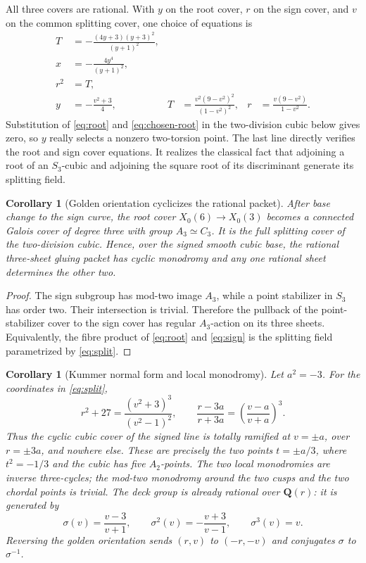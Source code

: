 \documentclass[11pt]{article}
\numberwithin{equation}{section}
\newtheorem{corollary}[theorem]{Corollary}
\theoremstyle{definition}
\theoremstyle{remark}
\newcommand{\Q}{\mathbf Q}
\begin{document}
All three covers are rational.  With \(y\) on the root cover, \(r\) on the
sign cover, and \(v\) on the common splitting cover, one choice of equations
is
\begin{align}
 T&=-\frac{(4y+3)(y+3)^2}{(y+1)^2},\label{eq:root}\\
 x&=-\frac{4y^4}{(y+1)^2},\label{eq:chosen-root}\\
 r^2&=T,\label{eq:sign}\\
 y&=-\frac{v^2+3}{4},&
 T&=\frac{v^2(9-v^2)^2}{(1-v^2)^2},&
 r&=\frac{v(9-v^2)}{1-v^2}.\label{eq:split}
\end{align}
Substitution of \eqref{eq:root} and \eqref{eq:chosen-root} in the
two-division cubic below gives zero, so \(y\) really selects a nonzero
two-torsion point.  The last line directly verifies the root and sign cover
equations.  It realizes the
classical fact that adjoining a root of an \(S_3\)-cubic and adjoining the
square root of its discriminant generate its splitting field.

\begin{corollary}[Golden orientation cyclicizes the rational packet]
After base change to the sign curve, the root cover \(X_0(6)\to X_0(3)\)
becomes a connected Galois cover of degree three with group \(A_3\simeq C_3\).
It is the full splitting cover of the two-division cubic.  Hence, over the
signed smooth cubic base, the rational three-sheet gluing packet has cyclic
monodromy and any one rational sheet determines the other two.
\end{corollary}

\begin{proof}
The sign subgroup has mod-two image \(A_3\), while a point stabilizer in
\(S_3\) has order two.  Their intersection is trivial.  Therefore the
pullback of the point-stabilizer cover to the sign cover has regular
\(A_3\)-action on its three sheets.  Equivalently, the fibre product of
\eqref{eq:root} and \eqref{eq:sign} is the splitting field parametrized by
\eqref{eq:split}.
\end{proof}

\begin{corollary}[Kummer normal form and local monodromy]
Let \(a^2=-3\).  For the coordinates in \eqref{eq:split},
\begin{equation}\label{eq:kummer-cubic}
 r^2+27=\frac{(v^2+3)^3}{(v^2-1)^2},
 \qquad
 \frac{r-3a}{r+3a}=\left(\frac{v-a}{v+a}\right)^3.
\end{equation}
Thus the cyclic cubic cover of the signed line is totally ramified at
\(v=\pm a\), over \(r=\pm3a\), and nowhere else.  These are precisely the
two points \(t=\pm a/3\), where \(t^2=-1/3\) and the cubic has five
\(A_2\)-points.  The two local monodromies are inverse three-cycles; the
mod-two monodromy around the two cusps and the two chordal points is trivial.
The deck group is already rational over \(\Q(r)\): it is generated by
\begin{equation}\label{eq:deck-sigma}
 \sigma(v)=\frac{v-3}{v+1},
 \qquad
 \sigma^2(v)=-\frac{v+3}{v-1},
 \qquad
 \sigma^3(v)=v.
\end{equation}
Reversing the golden orientation sends \((r,v)\) to \((-r,-v)\) and
conjugates \(\sigma\) to \(\sigma^{-1}\).
\end{corollary}
\end{document}
